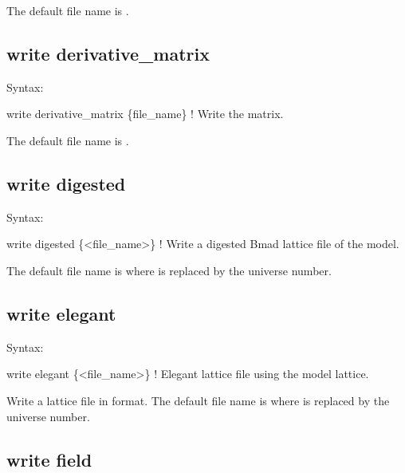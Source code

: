 {{{{{{{{{{{{The default file name is .


\subsection{write derivative_matrix}
\label{s:write.deriv.matrix}

Syntax:
\begin{example}
    write derivative_matrix \{file_name\}    ! Write the  matrix.
\end{example}

The default file name is . 


\subsection{write digested}
\label{s:write.digested}

Syntax:
\begin{example}
    write digested \{<file_name>\}      ! Write a digested Bmad lattice file of the model.
\end{example}

The default file name is  where \vn{\#} is replaced by the universe number. 



\subsection{write elegant}
\label{s:write.elegant}

Syntax:
\begin{example}
    write elegant \{<file_name>\}           ! Elegant lattice file using the model lattice.
\end{example}

Write a lattice file in  format. The default file name is  where \vn{\#}
is replaced by the universe number.


\subsection{write field}
\label{s:write.field}

}}}}}}}}}}}}
